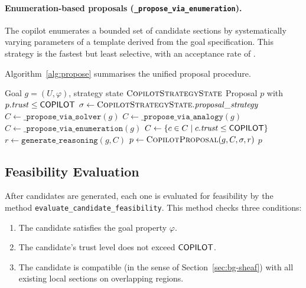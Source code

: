 \documentclass[11pt]{article}
\newcommand{\CP}{\textsc{CopilotProposal}}
\newcommand{\CSS}{\textsc{CopilotStrategyState}}
\newcommand{\strat}{\sigma}
\begin{document}
\paragraph{Enumeration-based proposals
(\texttt{\_propose\_via\_enumeration}).}
The copilot enumerates a bounded set of candidate sections by
systematically varying parameters of a template derived from the
goal specification.  This strategy is the fastest but least
selective, with an acceptance rate of \ppLXXXVIenumAcceptRate{}.

Algorithm~\ref{alg:propose} summarises the unified proposal
procedure.

\begin{algorithm}[t]
\caption{Copilot Proposal Generation}\label{alg:propose}
\begin{algorithmic}[1]
\REQUIRE Goal $g = (U, \varphi)$, strategy state $\CSS$
\ENSURE  Proposal $p$ with $p.\mathit{trust} \le \mathsf{COPILOT}$
\STATE $\strat \leftarrow \CSS.\mathit{proposal\_strategy}$
\IF{$\strat = \mathsf{solver}$}
    \STATE $C \leftarrow \texttt{\_propose\_via\_solver}(g)$
\ELSIF{$\strat = \mathsf{analogy}$}
    \STATE $C \leftarrow \texttt{\_propose\_via\_analogy}(g)$
\ELSE
    \STATE $C \leftarrow \texttt{\_propose\_via\_enumeration}(g)$
\ENDIF
\STATE $C \leftarrow \{c \in C \mid c.\mathit{trust} \le \mathsf{COPILOT}\}$
\STATE $r \leftarrow \texttt{generate\_reasoning}(g, C)$
\STATE $p \leftarrow \CP(g, C, \strat, r)$
\RETURN $p$
\end{algorithmic}
\end{algorithm}

\subsection{Feasibility Evaluation}\label{sec:proto-feasibility}

After candidates are generated, each one is evaluated for feasibility
by the method \texttt{evaluate\_candidate\_feasibility}.  This
method checks three conditions:
\begin{enumerate}
  \item The candidate satisfies the goal property $\varphi$.
  \item The candidate's trust level does not exceed $\mathsf{COPILOT}$.
  \item The candidate is compatible (in the sense of
        Section~\ref{sec:bg-sheaf}) with all existing local sections
        on overlapping regions.
\end{enumerate}
\end{document}
